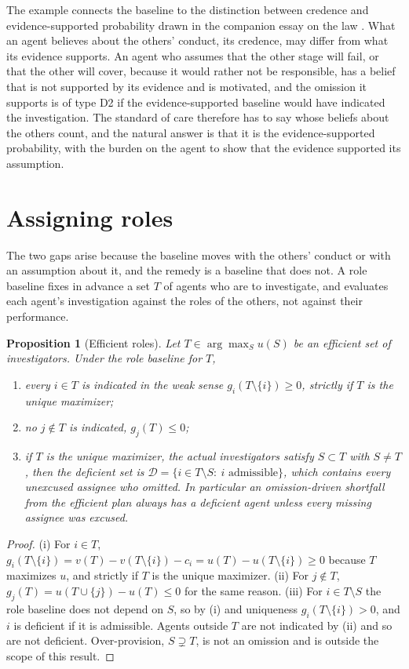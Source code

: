 \documentclass[11pt]{article}
\newcommand{\Dfc}{\mathcal D}
\theoremstyle{plain}
\newtheorem{proposition}{Proposition}
\theoremstyle{definition}
\begin{document}
The example connects the baseline to the distinction between credence and evidence-supported probability drawn in the companion essay on the law \cite{flyxion2026law}. What an agent believes about the others' conduct, its credence, may differ from what its evidence supports. An agent who assumes that the other stage will fail, or that the other will cover, because it would rather not be responsible, has a belief that is not supported by its evidence and is motivated, and the omission it supports is of type D2 if the evidence-supported baseline would have indicated the investigation. The standard of care therefore has to say whose beliefs about the others count, and the natural answer is that it is the evidence-supported probability, with the burden on the agent to show that the evidence supported its assumption.

\section{Assigning roles}\label{sec:roles}

The two gaps arise because the baseline moves with the others' conduct or with an assumption about it, and the remedy is a baseline that does not. A role baseline fixes in advance a set $T$ of agents who are to investigate, and evaluates each agent's investigation against the roles of the others, not against their performance.

\begin{proposition}[Efficient roles]\label{prop:roles}
Let $T\in\arg\max_Su(S)$ be an efficient set of investigators. Under the role baseline for $T$,
\begin{enumerate}[label=(\roman*),nosep]
\item every $i\in T$ is indicated in the weak sense $g_i(T\setminus\{i\})\ge0$, strictly if $T$ is the unique maximizer;
\item no $j\notin T$ is indicated, $g_j(T)\le0$;
\item if $T$ is the unique maximizer, the actual investigators satisfy $S\subset T$ with $S\ne T$, then the deficient set is $\Dfc=\{i\in T\setminus S:\ i\text{ admissible}\}$, which contains every unexcused assignee who omitted. In particular an omission-driven shortfall from the efficient plan always has a deficient agent unless every missing assignee was excused.
\end{enumerate}
\end{proposition}

\begin{proof}
(i) For $i\in T$, $g_i(T\setminus\{i\})=v(T)-v(T\setminus\{i\})-c_i=u(T)-u(T\setminus\{i\})\ge0$ because $T$ maximizes $u$, and strictly if $T$ is the unique maximizer. (ii) For $j\notin T$, $g_j(T)=u(T\cup\{j\})-u(T)\le0$ for the same reason. (iii) For $i\in T\setminus S$ the role baseline does not depend on $S$, so by (i) and uniqueness $g_i(T\setminus\{i\})>0$, and $i$ is deficient if it is admissible. Agents outside $T$ are not indicated by (ii) and so are not deficient. Over-provision, $S\supsetneq T$, is not an omission and is outside the scope of this result.
\end{proof}
\end{document}
